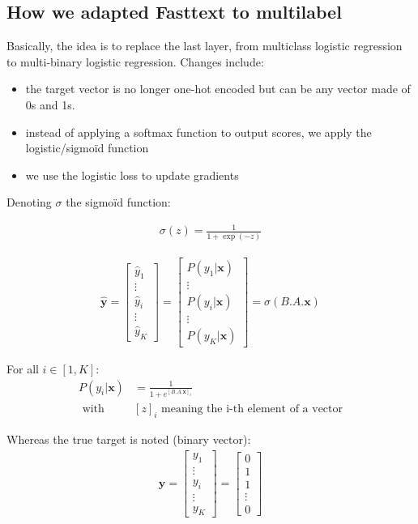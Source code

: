 \subsection{How we adapted Fasttext to multilabel}

Basically, the idea is to replace the last layer, from multiclass logistic regression to multi-binary logistic regression. Changes include:

\begin{itemize}
	\item the target vector is no longer one-hot encoded but can be any vector made of 0s and 1s.
	\item instead of applying a softmax function to output scores, we apply the logistic/sigmoïd function
	\item we use the logistic loss to update gradients
\end{itemize}


Denoting $\sigma$ the sigmoïd function:

\begin{align}
	\sigma(z) = \frac{1}{1 + \exp(-z)}
\end{align}

\begin{align}
 \mathbf{\hat y}
 	= \begin{bmatrix} 
		\hat y_1 \\
		\vdots \\
		\hat y_i\\
		\vdots \\
		\hat y_K
	\end{bmatrix}
	 = \begin{bmatrix} 
		P(y_1 | \mathbf{x}) \\
		\vdots \\
		P(y_i | \mathbf{x})\\
		\vdots \\
		P(y_K | \mathbf{x})
	\end{bmatrix} = 
	\sigma(B.A.\mathbf{x})
\end{align}

For all $i \in [1, K]$: 
\begin{align}
	P(y_i | \mathbf{x}) &= \frac{1}{1 + e^{[B.A.\mathbf{x}]_i}}\\
		\text{      with } &[z]_i \text{ meaning the i-th element of a vector}
\end{align}

Whereas the true target is noted (binary vector):
\begin{align}
 \mathbf{y} = 
	\begin{bmatrix} 
		y_1 \\
		\vdots \\
		y_i \\
		\vdots \\
		y_K
	\end{bmatrix}
	= 
	\begin{bmatrix} 
		0 \\
		1 \\
		1 \\
		\vdots \\
		0
	\end{bmatrix}  
\end{align}

